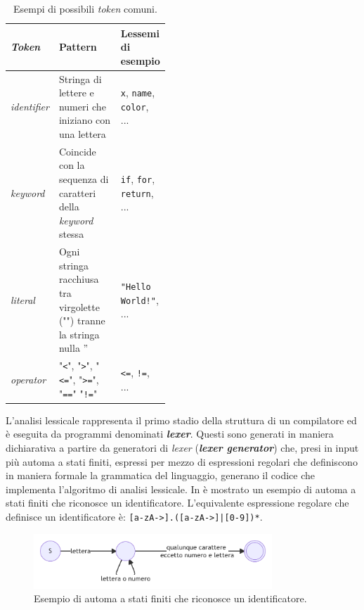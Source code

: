 \begin{table}[h]
    \centering
    \begin{tabular}{|p{0.15\linewidth}|p{0,45\linewidth}|p{0.3\linewidth}|}
        \hline
        \textbf{\textit{Token}} & \textbf{Pattern} & \textbf{Lessemi di esempio} \\ [0.5ex] 
        \hline\hline
        \textit{identifier} & Stringa di lettere e numeri che iniziano con una lettera & \texttt{x}, \texttt{name}, \texttt{color}, ... \\ 
        \hline
        \textit{keyword} & Coincide con la sequenza di caratteri della \textit{keyword} stessa & \texttt{if}, \texttt{for}, \texttt{return}, ... \\
        \hline
        \textit{literal} & Ogni stringa racchiusa tra virgolette ("") tranne la stringa nulla '' & \texttt{"Hello World!"}, ... \\
        \hline
        \textit{operator} & "\texttt{<}", "\texttt{>}", "\texttt{<=}", "\texttt{>=}", "\texttt{==}" "\texttt{!=}" & \texttt{<=}, \texttt{!=}, ... \\
        \hline
    \end{tabular}
    \caption{Esempi di possibili \textit{token} comuni.}
    \label{table:token-examples}
\end{table}

L'analisi lessicale rappresenta il primo stadio della struttura di un compilatore ed è eseguita da programmi denominati \textbf{\textit{lexer}}. 
%
Questi sono generati in maniera dichiarativa a partire da generatori di \textit{lexer} (\textbf{\textit{lexer generator}}) che, presi in input più automa a stati finiti, espressi per mezzo di espressioni regolari che definiscono in maniera formale la grammatica del linguaggio, generano il codice che implementa l'algoritmo di analisi lessicale. 
%
In  è mostrato un esempio di automa a stati finiti che riconosce un identificatore.
%
L'equivalente espressione regolare che definisce un identificatore è: \texttt{[a-zA->].([a-zA->]|[0-9])*}.

\begin{figure}[h]
    \centering
    \includegraphics[width=0.8\textwidth]{resources/img/01-id-finite-automa.pdf}
    \caption{Esempio di automa a stati finiti che riconosce un identificatore.}
    \label{img:01-id-finite-automa}
\end{figure}

